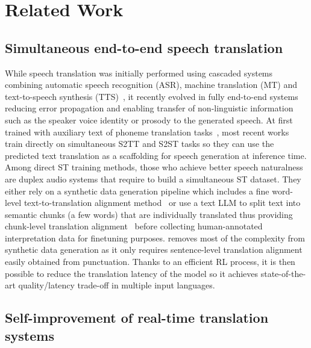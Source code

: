 \section{Related Work}
\label{related-work}

\subsection{Simultaneous end-to-end speech translation}

While speech translation was initially performed using cascaded systems combining automatic speech recognition (ASR), machine translation (MT) and text-to-speech synthesis (TTS)~\cite{wahlster2000verbmobil, nakamura2006atr}, it recently evolved in fully end-to-end systems~\cite{jia19_translatotron,lee-etal-2022-direct,jia22-translatotron2,audiopalm} reducing error propagation and enabling transfer of non-linguistic information such as the speaker voice identity or prosody to the generated speech. At first trained with auxiliary text of phoneme translation tasks~\cite{jia22-translatotron2, streamspeech}, most recent works~\cite{seamless,hibiki,seed_liveinterpret_2, google_s2st} train directly on simultaneous S2TT and S2ST tasks so they can use the predicted text translation as a scaffolding for speech generation at inference time. Among direct ST training methods, those who achieve better speech naturalness are duplex audio systems that require to build a simultaneous ST dataset. They either rely on a synthetic data generation pipeline which includes a fine word-level text-to-translation alignment method~\cite{hibiki, google_s2st} or use a text LLM to split text into semantic chunks (a few words) that are individually translated thus providing chunk-level translation alignment~\cite{seed_liveinterpret_2} before collecting human-annotated interpretation data for finetuning purposes. \ours{} removes most of the complexity from synthetic data generation as it only requires sentence-level translation alignment easily obtained from punctuation. Thanks to an efficient RL process, it is then possible to reduce the translation latency of the model so it achieves state-of-the-art quality/latency trade-off in multiple input languages.


\subsection{Self-improvement of real-time translation systems}

